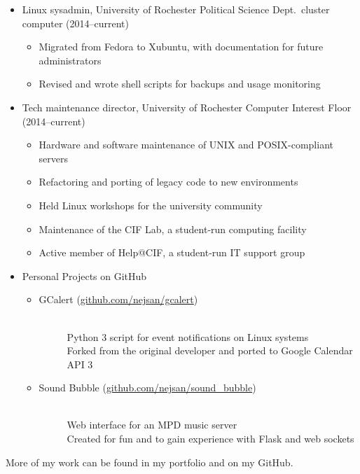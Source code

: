 \documentclass[10pt]{article}
\begin{document}
\begin{itemize}
	\item Linux sysadmin, University of Rochester Political Science Dept.\ cluster computer (2014--current)
		\begin{itemize}
			\item Migrated from Fedora to Xubuntu, with documentation for future administrators
			\item Revised and wrote shell scripts for backups and usage monitoring
		\end{itemize}
	\item Tech maintenance director, University of Rochester Computer Interest Floor (2014--current)
		\begin{itemize}
			\item Hardware and software maintenance of UNIX and POSIX-compliant servers
			\item Refactoring and porting of legacy code to new environments
			\item Held Linux workshops for the university community
			\item Maintenance of the CIF Lab, a student-run computing facility
			\item Active member of Help@CIF, a student-run IT support group
		\end{itemize}
	\item Personal Projects on GitHub
		\begin{itemize}
			\item \begin{description}
				\item[GCalert (\href{https://github.com/nejsan/gcalert}{github.com/nejsan/gcalert})] \hfill \\
					Python 3 script for event notifications on Linux systems \\
					Forked from the original developer and ported to Google Calendar API 3
			\end{description}
			\item \begin{description}
				\item[Sound Bubble (\href{https://github.com/nejsan/sound_bubble}{github.com/nejsan/sound\_bubble})] \hfill \\
					Web interface for an MPD music server \\
					Created for fun and to gain experience with Flask and web sockets
			\end{description}
		\end{itemize}
\end{itemize}
\vspace{-0.75em}
More of my work can be found in my portfolio and on my GitHub.
\end{document}
